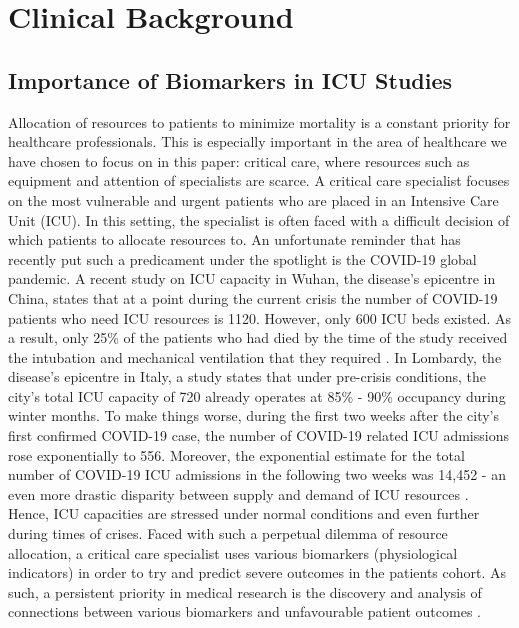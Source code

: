 
\chapter{Clinical Background} %

\label{chapter1} %


\section{Importance of Biomarkers in ICU Studies}

Allocation of resources to patients to minimize mortality is a constant priority for healthcare professionals. This is especially important in the area of healthcare we have chosen to focus on in this paper: critical care,  where resources such as equipment and attention of specialists are  scarce. A critical care specialist focuses on the most vulnerable and urgent patients who are placed in an Intensive Care Unit (ICU). In this setting, the specialist is often faced with a difficult decision of which patients to allocate resources to. An unfortunate reminder that has recently put such a predicament under the spotlight is the COVID-19 global pandemic. A recent study on ICU capacity in Wuhan, the disease's epicentre in China, states that at a point during the current crisis the number of COVID-19 patients who need ICU resources is 1120. However, only 600 ICU beds existed. As a result, only 25\% of the patients who had died by the time of the study received the intubation and mechanical ventilation that they required \citep{wu2020characteristics}. In Lombardy, the disease's epicentre in Italy, a study states that under pre-crisis conditions,  the city's  total ICU capacity of 720 already operates at 85\% - 90\% occupancy during winter months. To make things worse, during the first two weeks after the city's first confirmed COVID-19 case, the number of COVID-19 related ICU admissions rose exponentially to 556. Moreover, the exponential estimate for the total number of COVID-19 ICU admissions in the following two weeks was 14,452 - an even more drastic disparity between supply and demand of ICU resources \citep{grasselli2020}. Hence, ICU capacities are stressed under normal conditions and even further during times of crises.  Faced with such a perpetual dilemma of resource allocation, a critical care specialist uses various biomarkers (physiological indicators) in order to try and predict severe outcomes in the patients cohort. As such, a persistent priority in medical research is the discovery and analysis of connections between various biomarkers and unfavourable patient outcomes \citep{ware2017biomarkers}. 

